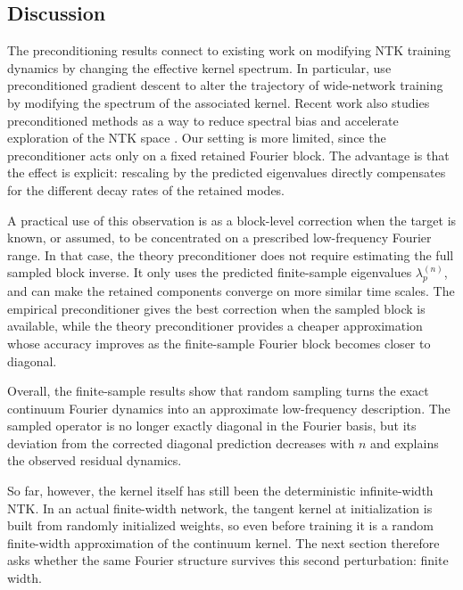 \subsection{Discussion}
\label{subsec:results-preconditioned-discussion}

The preconditioning results connect to existing work on modifying NTK training
dynamics by changing the effective kernel spectrum. In particular,
\citet{geifman2024controlling} use preconditioned gradient descent to alter the
trajectory of wide-network training by modifying the spectrum of the associated
kernel. Recent work also studies preconditioned methods as a way to reduce
spectral bias and accelerate exploration of the NTK space
\citep{jiang2026convergencepreconditioned, yang2024sharpgeneralization}. Our
setting is more limited, since the preconditioner acts only on a fixed retained
Fourier block. The advantage is that the effect is explicit: rescaling by the
predicted eigenvalues directly compensates for the different decay rates of the
retained modes.

A practical use of this observation is as a block-level correction when the
target is known, or assumed, to be concentrated on a prescribed low-frequency
Fourier range. In that case, the theory preconditioner does not require
estimating the full sampled block inverse. It only uses the predicted
finite-sample eigenvalues \(\lambda_p^{(n)}\), and can make the retained
components converge on more similar time scales. The empirical preconditioner
gives the best correction when the sampled block is available, while the theory
preconditioner provides a cheaper approximation whose accuracy improves as the
finite-sample Fourier block becomes closer to diagonal.

Overall, the finite-sample results show that random sampling turns the exact
continuum Fourier dynamics into an approximate low-frequency description. The
sampled operator is no longer exactly diagonal in the Fourier basis, but its
deviation from the corrected diagonal prediction decreases with \(n\) and
explains the observed residual dynamics.

So far, however, the kernel itself has still been the deterministic
infinite-width NTK. In an actual finite-width network, the tangent kernel at
initialization is built from randomly initialized weights, so even before
training it is a random finite-width approximation of the continuum kernel. The
next section therefore asks whether the same Fourier structure survives this
second perturbation: finite width.


